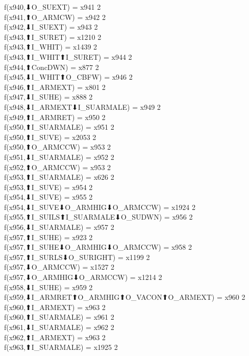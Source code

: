 f(x940,⬇O_SUEXT) = x941 {2} \\
f(x941,⬆O_ARMCW) = x942 {2} \\
f(x942,⬇I_SUEXT) = x943 {2} \\
f(x943,⬆I_SURET) = x1210 {2} \\
f(x943,⬆I_WHIT) = x1439 {2} \\
f(x943,⬆I_WHIT⬆I_SURET) = x944 {2} \\
f(x944,⬆ConcDWN) = x877 {2} \\
f(x945,⬇I_WHIT⬆O_CBFW) = x946 {2} \\
f(x946,⬆I_ARMEXT) = x801 {2} \\
f(x947,⬇I_SUHE) = x888 {2} \\
f(x948,⬇I_ARMEXT⬇I_SUARMALE) = x949 {2} \\
f(x949,⬆I_ARMRET) = x950 {2} \\
f(x950,⬆I_SUARMALE) = x951 {2} \\
f(x950,⬆I_SUVE) = x2053 {2} \\
f(x950,⬆O_ARMCCW) = x953 {2} \\
f(x951,⬇I_SUARMALE) = x952 {2} \\
f(x952,⬆O_ARMCCW) = x953 {2} \\
f(x953,⬆I_SUARMALE) = x626 {2} \\
f(x953,⬆I_SUVE) = x954 {2} \\
f(x954,⬇I_SUVE) = x955 {2} \\
f(x954,⬇I_SUVE⬇O_ARMHIG⬇O_ARMCCW) = x1924 {2} \\
f(x955,⬆I_SUILS⬆I_SUARMALE⬇O_SUDWN) = x956 {2} \\
f(x956,⬇I_SUARMALE) = x957 {2} \\
f(x957,⬆I_SUHE) = x923 {2} \\
f(x957,⬆I_SUHE⬇O_ARMHIG⬇O_ARMCCW) = x958 {2} \\
f(x957,⬆I_SURLS⬇O_SURIGHT) = x1199 {2} \\
f(x957,⬇O_ARMCCW) = x1527 {2} \\
f(x957,⬇O_ARMHIG⬇O_ARMCCW) = x1214 {2} \\
f(x958,⬇I_SUHE) = x959 {2} \\
f(x959,⬇I_ARMRET⬆O_ARMHIG⬆O_VACON⬆O_ARMEXT) = x960 {2} \\
f(x960,⬆I_ARMEXT) = x963 {2} \\
f(x960,⬆I_SUARMALE) = x961 {2} \\
f(x961,⬇I_SUARMALE) = x962 {2} \\
f(x962,⬆I_ARMEXT) = x963 {2} \\
f(x963,⬆I_SUARMALE) = x1925 {2} \\
